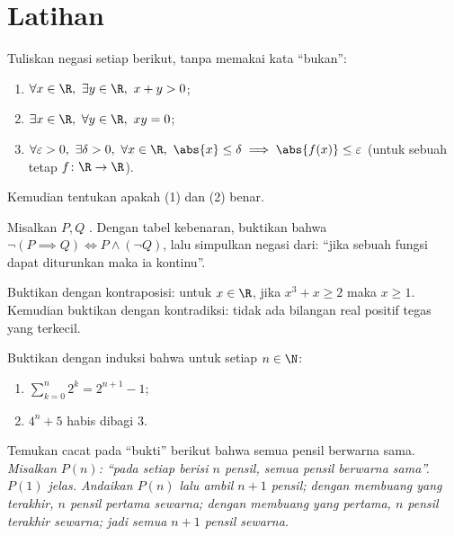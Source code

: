 \section{Latihan}

\begin{exercise}[$\star$]\label{exo:b1:logic:1}
Tuliskan negasi setiap  berikut, tanpa memakai kata ``bukan'':
\begin{enumerate}
  \item $\forall x \in \R,\ \exists y \in \R,\ x + y > 0$;
  \item $\exists x \in \R,\ \forall y \in \R,\ xy = 0$;
  \item $\forall \varepsilon > 0,\ \exists \delta > 0,\ \forall x \in
        \R,\ \abs{x} \leq \delta \implies \abs{f(x)} \leq \varepsilon$
        (untuk sebuah  tetap $f \colon \R \to \R$).
\end{enumerate}
Kemudian tentukan apakah  (1) dan (2) benar.
\end{exercise}

\begin{exercise}[$\star$]\label{exo:b1:logic:2}
Misalkan $P, Q$ . Dengan tabel kebenaran, buktikan bahwa
$\lnot(P \implies Q) \iff P \land (\lnot Q)$, lalu simpulkan negasi
dari: ``jika sebuah fungsi dapat diturunkan maka ia kontinu''.
\end{exercise}

\begin{exercise}[$\star$]\label{exo:b1:logic:3}
Buktikan dengan kontraposisi: untuk $x \in \R$, jika $x^3 + x \geq 2$
maka $x \geq 1$. Kemudian buktikan dengan kontradiksi: tidak ada
bilangan real positif tegas yang terkecil.
\end{exercise}

\begin{exercise}[$\star$]\label{exo:b1:logic:4}
Buktikan dengan induksi bahwa untuk setiap $n \in \N$:
\begin{enumerate}
  \item $\sum_{k=0}^{n} 2^k = 2^{n+1} - 1$;
  \item $4^n + 5$ habis dibagi $3$.
\end{enumerate}
\end{exercise}

\begin{exercise}[$\star$]\label{exo:b1:logic:5}
Temukan cacat pada ``bukti'' berikut bahwa semua pensil berwarna sama.
\emph{Misalkan $P(n)$: ``pada setiap  berisi $n$ pensil, semua
pensil berwarna sama''. $P(1)$ jelas. Andaikan $P(n)$ lalu ambil $n+1$
pensil; dengan membuang yang terakhir, $n$ pensil pertama sewarna;
dengan membuang yang pertama, $n$ pensil terakhir sewarna; jadi semua
$n+1$ pensil sewarna.}
\end{exercise}

